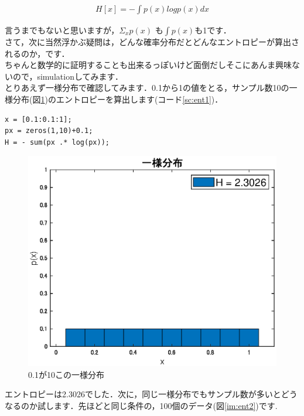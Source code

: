 \documentclass[11pt,a4paper,uplatex]{ujreport}
\begin{document}
\begin{eqnarray}
\label{eq:entropy2}
H[x] = - \int p(x) log p(x) dx
\end{eqnarray}

言うまでもないと思いますが，$ \Sigma_{x} p(x)$ も$ \int p(x)$も1です．\\

さて，次に当然浮かぶ疑問は，どんな確率分布だとどんなエントロピーが算出されるのか，です．\\

ちゃんと数学的に証明することも出来るっぽいけど面倒だしそこにあんま興味ないので，simulationしてみます．\\

とりあえず一様分布で確認してみます．0.1から1の値をとる，サンプル数10の一様分布(図\ref{im:ent1})のエントロピーを算出します(コード\ref{sc:ent1})．
\begin{lstlisting}[caption=エントロピーの計算,label=sc:ent1]
x = [0.1:0.1:1];
px = zeros(1,10)+0.1;
H = - sum(px .* log(px));

\end{lstlisting}

\begin{figure}[H]
\label{im:ent1}
  \centering
  \includegraphics[width=15cm]{../figures/ent_uni.eps}
  \caption{0.1が10この一様分布}
\end{figure}

エントロピーは2.3026でした．次に，同じ一様分布でもサンプル数が多いとどうなるのか試します．先ほどと同じ条件の，100個のデータ(図\ref{im:ent2})です.
\end{document}
